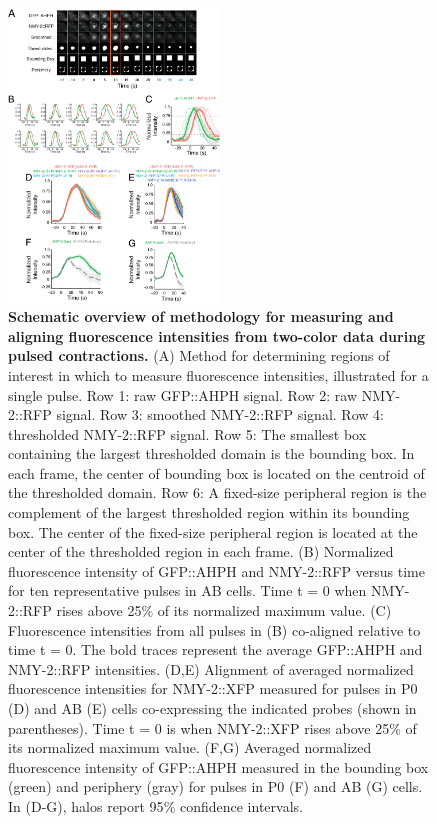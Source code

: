 






\begin{figure}[!htbp]
\centering
\includegraphics[width=0.5\textwidth]{pulse/Figure2-12}

\caption{ \label{fig:2212} \textbf{Schematic overview of methodology for measuring and aligning fluorescence intensities from two-color data during pulsed contractions.} (A) Method for determining regions of interest in which to measure fluorescence intensities, illustrated for a single pulse.  Row 1:  raw GFP::AHPH signal. Row 2: raw NMY-2::RFP signal.  Row 3: smoothed NMY-2::RFP signal. Row 4: thresholded NMY-2::RFP signal. Row 5: The smallest box containing the largest thresholded domain is the bounding box.  In each frame, the center of bounding box is located on the centroid of the thresholded domain. Row 6: A fixed-size peripheral region is the complement of the largest thresholded region within its bounding box.      The center of the fixed-size peripheral region is located at the center of the thresholded region in each frame.  (B) Normalized fluorescence intensity of GFP::AHPH and NMY-2::RFP versus time for ten representative pulses in AB cells. Time t = 0 when NMY-2::RFP rises above 25$\%$ of its normalized maximum value. (C) Fluorescence intensities from all pulses in (B) co-aligned relative to time t = 0. The bold traces represent the average GFP::AHPH and NMY-2::RFP intensities. (D,E) Alignment of averaged normalized fluorescence intensities for NMY-2::XFP measured for pulses in P0 (D) and AB (E) cells co-expressing the indicated probes (shown in parentheses). Time t = 0 is when NMY-2::XFP rises above 25$\%$ of its normalized maximum value. (F,G) Averaged normalized fluorescence intensity of GFP::AHPH measured in the bounding box (green) and periphery (gray) for pulses in P0 (F) and AB (G) cells.  In (D-G), halos report 95$\%$ confidence intervals.}
\end{figure}
















